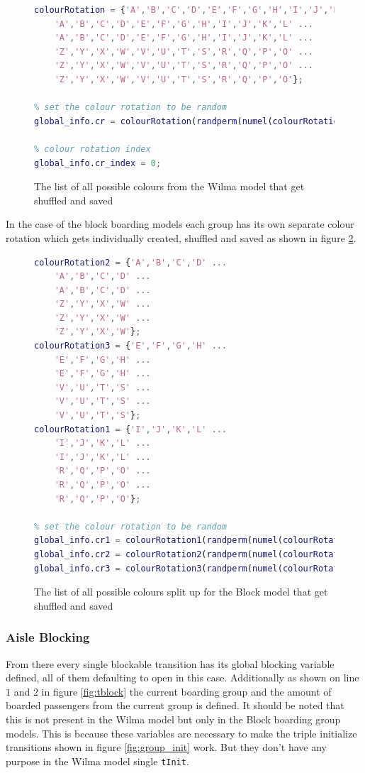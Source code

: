 \documentclass[english]{article}
\begin{document}
\begin{figure}[H]
    \centering
\begin{lstlisting}[language=MATLAB]
% full list of coloured tokens
colourRotation = {'A','B','C','D','E','F','G','H','I','J','K','L' ...
    'A','B','C','D','E','F','G','H','I','J','K','L' ...
    'A','B','C','D','E','F','G','H','I','J','K','L' ...
    'Z','Y','X','W','V','U','T','S','R','Q','P','O' ...
    'Z','Y','X','W','V','U','T','S','R','Q','P','O' ...
    'Z','Y','X','W','V','U','T','S','R','Q','P','O'};

% set the colour rotation to be random
global_info.cr = colourRotation(randperm(numel(colourRotation)));

% colour rotation index
global_info.cr_index = 0;
\end{lstlisting}
    \caption{The list of all possible colours from the Wilma model that get shuffled and saved}
    \label{fig:colour_list}
\end{figure}

In the case of the block boarding models each group has its own separate colour rotation which gets individually created, shuffled and saved as shown in figure \ref{fig:colour_listblock}.

\begin{figure}[H]
    \centering
\begin{lstlisting}[language=MATLAB]
% full list of coloured tokens
colourRotation2 = {'A','B','C','D' ...
    'A','B','C','D' ...
    'A','B','C','D' ...
    'Z','Y','X','W' ...
    'Z','Y','X','W' ...
    'Z','Y','X','W'};
colourRotation3 = {'E','F','G','H' ...
    'E','F','G','H' ...
    'E','F','G','H' ...
    'V','U','T','S' ... 
    'V','U','T','S' ...
    'V','U','T','S'};
colourRotation1 = {'I','J','K','L' ...
    'I','J','K','L' ...
    'I','J','K','L' ...
    'R','Q','P','O' ...
    'R','Q','P','O' ...
    'R','Q','P','O'};

% set the colour rotation to be random
global_info.cr1 = colourRotation1(randperm(numel(colourRotation1)));
global_info.cr2 = colourRotation2(randperm(numel(colourRotation2)));
global_info.cr3 = colourRotation3(randperm(numel(colourRotation3)));
\end{lstlisting}
    \caption{The list of all possible colours split up for the Block model that get shuffled and saved}
    \label{fig:colour_listblock}
\end{figure}


\subsubsection{Aisle Blocking}
From there every single blockable transition has its global blocking variable defined, all of them defaulting to open in this case. Additionally as shown on line $1$ and $2$ in figure \ref{fig:tblock} the current boarding group and the amount of boarded passengers from the current group is defined. It should be noted that this is not present in the Wilma model but only in the Block boarding group models. This is because these variables are necessary to make the triple initialize transitions shown in figure \ref{fig:group_init} work. But they don't have any purpose in the Wilma model single \lstinline{tInit}.
\end{document}
